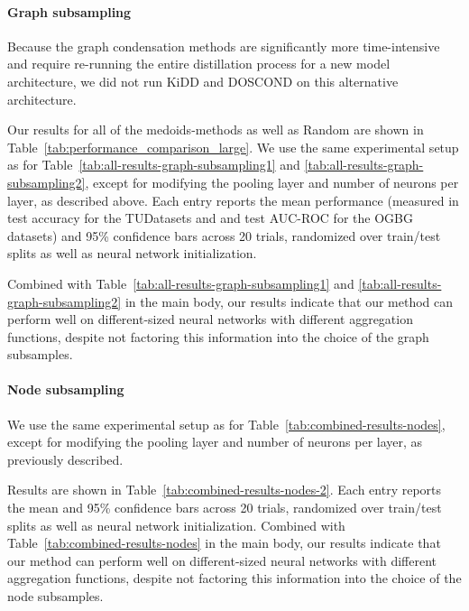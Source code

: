 \paragraph{Graph subsampling} Because the graph condensation methods are significantly more time-intensive and require re-running the entire distillation process for a new model architecture, we did not run KiDD and DOSCOND on this alternative architecture. 

Our results for all of the medoids-methods as well as Random are shown in Table~\ref{tab:performance_comparison_large}. We use the same experimental setup as for Table~\ref{tab:all-results-graph-subsampling1} and \ref{tab:all-results-graph-subsampling2}, except for modifying the pooling layer and number of neurons per layer, as described above. Each entry reports the mean performance (measured in test accuracy for the TUDatasets and and test AUC-ROC for the OGBG datasets) and 95\% confidence bars across 20 trials, randomized over train/test splits as well as neural network initialization. 

Combined with Table~\ref{tab:all-results-graph-subsampling1} and \ref{tab:all-results-graph-subsampling2} in the main body, our results indicate that our method can perform well on different-sized neural networks with different aggregation functions, despite not factoring this information into the choice of the graph subsamples. 

\paragraph{Node subsampling} We use the same experimental setup as for Table~\ref{tab:combined-results-nodes}, except for modifying the pooling layer and number of neurons per layer, as previously described. 

Results are shown in Table~\ref{tab:combined-results-nodes-2}. Each entry reports the mean and 95\% confidence bars across 20 trials, randomized over train/test splits as well as neural network initialization. Combined with Table~\ref{tab:combined-results-nodes} in the main body, our results indicate that our method can perform well on different-sized neural networks with different aggregation functions, despite not factoring this information into the choice of the node subsamples.

